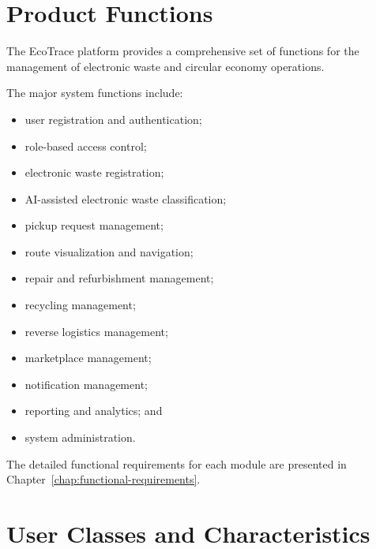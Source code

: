 \section{Product Functions}
\label{sec:product-functions}

The EcoTrace platform provides a comprehensive set of functions for the
management of electronic waste and circular economy operations.

The major system functions include:

\begin{itemize}

\item user registration and authentication;

\item role-based access control;

\item electronic waste registration;

\item AI-assisted electronic waste classification;

\item pickup request management;

\item route visualization and navigation;

\item repair and refurbishment management;

\item recycling management;

\item reverse logistics management;

\item marketplace management;

\item notification management;

\item reporting and analytics; and

\item system administration.

\end{itemize}

The detailed functional requirements for each module are presented in
Chapter~\ref{chap:functional-requirements}.

\section{User Classes and Characteristics}
\label{sec:user-classes}

